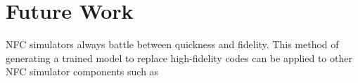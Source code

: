 \section{Future Work}

\gls{NFC} simulators always battle between
quickness and fidelity. This method of generating
a trained model to replace high-fidelity codes 
can be applied to other \gls{NFC} simulator components
such as 